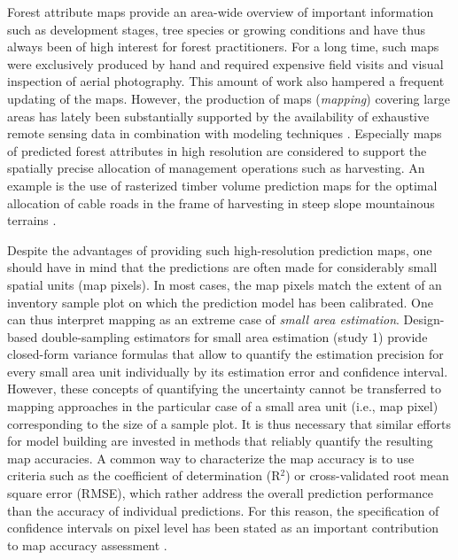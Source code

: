 
Forest attribute maps provide an area-wide overview of important information such as development stages, tree species or growing conditions and have thus always been of high interest for forest practitioners. For a long time, such maps were exclusively produced by hand and required expensive field visits and visual inspection of aerial photography. This amount of work also hampered a frequent updating of the maps. However, the production of maps (\textit{mapping}) covering large areas has lately been substantially supported by the availability of exhaustive remote sensing data in combination with modeling techniques \citep{brosofske2014}. Especially maps of predicted forest attributes in high resolution are considered to support the spatially precise allocation of management operations such as harvesting. An example is the use of rasterized timber volume prediction maps for the optimal allocation of cable roads in the frame of harvesting in steep slope mountainous terrains \citep{bont2012, bont2015}.\par

Despite the advantages of providing such high-resolution prediction maps, one should have in mind that the predictions are often made for considerably small spatial units (map pixels). In most cases, the map pixels match the extent of an inventory sample plot on which the prediction model has been calibrated. One can thus interpret mapping as an extreme case of \textit{small area estimation}. Design-based double-sampling estimators for small area estimation (study 1) provide closed-form variance formulas that allow to quantify the estimation precision for every small area unit individually by its estimation error and confidence interval. However, these concepts of quantifying the uncertainty cannot be transferred to mapping approaches in the particular case of a small area unit (i.e., map pixel) corresponding to the size of a sample plot. It is thus necessary that similar efforts for model building are invested in methods that reliably quantify the resulting map accuracies. A common way to characterize the map accuracy is to use criteria such as the coefficient of determination (R$^2$) or cross-validated root mean square error (RMSE), which rather address the overall prediction performance than the accuracy of individual predictions. For this reason, the specification of confidence intervals on pixel level has been stated as an important contribution to map accuracy assessment \citep{mcroberts2010a}.\par

